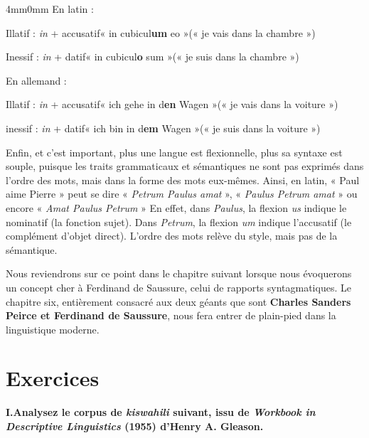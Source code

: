 \begin{adjustwidth}{4mm}{0mm}
En latin :

Illatif : \textit{in} + accusatif\quad « in cubicul\textbf{um} eo »\quad (« je vais dans la chambre »)

Inessif : \textit{in} + datif\quad « in cubicul\textbf{o} sum »\quad (« je suis dans la chambre »)

En allemand :

Illatif : \textit{in} + accusatif\quad « ich gehe in d\textbf{en} Wagen »\quad (« je vais dans la voiture »)

inessif : \textit{in} + datif\quad « ich bin in d\textbf{em} Wagen »\quad (« je suis dans la voiture »)
\end{adjustwidth}

Enfin, et c’est important, plus une langue est flexionnelle, plus sa syntaxe est souple, puisque les traits grammaticaux et sémantiques ne sont pas exprimés dans l’ordre des mots, mais dans la forme des mots eux-mêmes. Ainsi, en latin, « Paul aime Pierre » peut se dire « \textit{Petrum Paulus amat} », « \textit{Paulus Petrum amat} » ou encore « \textit{Amat Paulus Petrum} » En effet, dans \textit{Paulus}, la flexion \textit{us} indique le nominatif (la fonction sujet). Dans \textit{Petrum}, la flexion \textit{um} indique l’accusatif (le complément d’objet direct). L’ordre des mots relève du style, mais pas de la sémantique.

Nous reviendrons sur ce point dans le chapitre suivant lorsque nous évoquerons un concept cher à Ferdinand de Saussure, celui de rapports syntagmatiques. Le chapitre six, entièrement consacré aux deux géants que sont \textbf{Charles Sanders Peirce et Ferdinand de Saussure}, nous fera entrer de plain-pied dans la linguistique moderne.

\clearpage
{}
\section*{Exercices}
\noindent\textbf{I.\quad Analysez le corpus de \textit{kiswahili} suivant, issu de \textit{Workbook in Descriptive Linguistics} (1955) d’Henry A. Gleason.}

